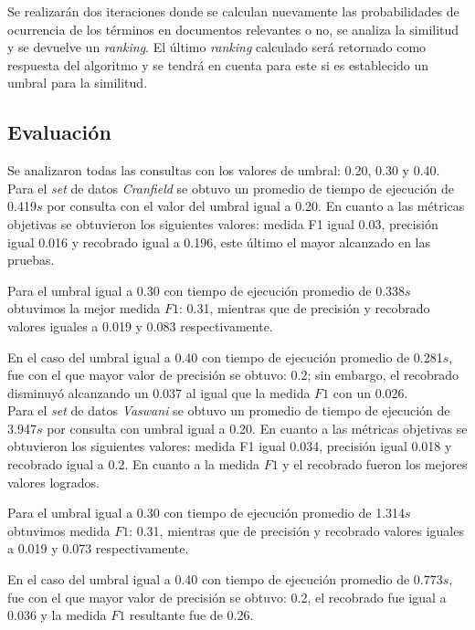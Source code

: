 \documentclass[spanish]{article}
\begin{document}
			Se realizarán dos iteraciones donde se calculan nuevamente las probabilidades de ocurrencia de los términos en documentos relevantes o no, se analiza la similitud y se devuelve un \emph{ranking}. El último \emph{ranking} calculado será retornado como respuesta del algoritmo y se tendrá en cuenta para este si es establecido un umbral para la similitud.

		
		\subsection*{Evaluación}
			
			Se analizaron todas las consultas con los valores de umbral: 0.20, 0.30 y 0.40.\\
 
			Para el \emph{set} de datos \emph{Cranfield} se obtuvo un promedio de tiempo de ejecución de 0.419$ s $ por consulta con el valor del umbral igual a 0.20. En cuanto a las métricas objetivas se obtuvieron los siguientes valores: medida F1 igual 0.03, precisión igual 0.016 y recobrado igual a 0.196, este último el mayor alcanzado en las pruebas.

			Para el umbral igual a 0.30 con tiempo de ejecución promedio de  0.338$s $ obtuvimos la mejor medida $ F1 $: 0.31, mientras que de precisión y recobrado valores iguales a 0.019 y 0.083 respectivamente.

			En el caso del umbral igual a 0.40 con tiempo de ejecución promedio de 0.281$ s $, fue con el que mayor valor de  precisión se obtuvo: 0.2; sin embargo, el recobrado disminuyó alcanzando un 0.037 al igual que la medida $ F1 $ con un 0.026.\\

			Para el \emph{set} de datos \emph{Vaswani} se obtuvo un promedio de tiempo de ejecución de 3.947$ s $ por consulta con umbral igual a 0.20. En cuanto a las métricas objetivas se obtuvieron los siguientes valores: medida F1 igual 0.034, precisión igual 0.018 y recobrado igual a 0.2. En cuanto a la medida $ F1 $ y el recobrado fueron los mejores valores logrados.

			Para el umbral igual a 0.30 con tiempo de ejecución promedio de  1.314$ s $ obtuvimos medida $ F1 $: 0.31, mientras que de precisión y recobrado valores iguales a 0.019 y 0.073 respectivamente.

			En el caso del umbral igual a 0.40 con tiempo de ejecución promedio de 0.773$ s $, fue con el que mayor valor de  precisión se obtuvo: 0.2, el recobrado fue igual a 0.036 y la medida $ F1 $ resultante fue de 0.26.
\end{document}
